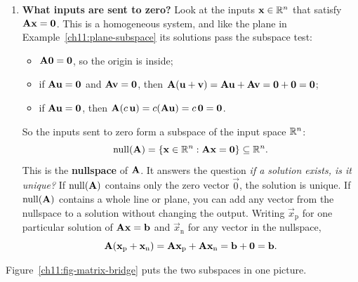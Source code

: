 \begin{enumerate}
  \item \textbf{What inputs are sent to zero?}
  Look at the inputs $\mathbf{x}\in\mathbb{R}^n$ that satisfy $\mathbf{A}\mathbf{x} = \mathbf{0}$. This is a
  homogeneous system, and like the plane in Example~\ref{ch11:plane-subspace} its
  solutions pass the subspace test:
  \begin{itemize}
    \item $\mathbf{A}\mathbf{0} = \mathbf{0}$, so the origin is inside;
    \item if $\mathbf{A}\mathbf{u}=\mathbf{0}$ and $\mathbf{A}\mathbf{v}=\mathbf{0}$, then
    $\mathbf{A}(\mathbf{u}+\mathbf{v}) = \mathbf{A}\mathbf{u}+\mathbf{A}\mathbf{v} = \mathbf{0}+\mathbf{0}=\mathbf{0}$;
    \item if $\mathbf{A}\mathbf{u}=\mathbf{0}$, then $\mathbf{A}(c\,\mathbf{u}) = c(\mathbf{A}\mathbf{u}) = c\,\mathbf{0}=\mathbf{0}$.
  \end{itemize}
  So the inputs sent to zero form a subspace of the input space $\mathbb{R}^n$:
  \[
  \operatorname{null}(\mathbf{A}) = \{\mathbf{x}\in\mathbb{R}^n : \mathbf{A}\mathbf{x}=\mathbf{0}\} \subseteq \mathbb{R}^n.
  \]
  This is the \textbf{nullspace} of $\mathbf{A}$. It answers the
  question \emph{if a solution exists, is it unique?} If $\operatorname{null}(\mathbf{A})$ contains only
  the zero vector $\vec{0}$, the solution is unique. If $\operatorname{null}(\mathbf{A})$ contains a
  whole line or plane, you can add any vector from the nullspace to a
  solution without changing the output. Writing $\vec{x}_{\text{p}}$ for one particular
  solution of $\mathbf{A}\mathbf{x}=\mathbf{b}$ and $\vec{x}_{\text{n}}$ for any vector in the
  nullspace,
  \[
  \mathbf{A}(\mathbf{x}_{\text{p}} + \mathbf{x}_{\text{n}}) = \mathbf{A}\mathbf{x}_{\text{p}} + \mathbf{A}\mathbf{x}_{\text{n}} = \mathbf{b} + \mathbf{0} = \mathbf{b}.
  \]
\end{enumerate}

Figure~\ref{ch11:fig-matrix-bridge} puts the two subspaces in one picture.

